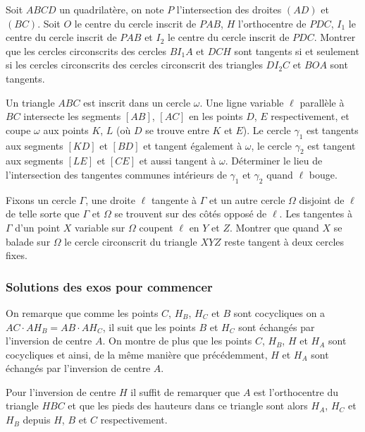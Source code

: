 \begin{exo}
Soit $ABCD$ un quadrilatère, on note $P$ l'intersection des droites $(AD)$ et $(BC)$. Soit $O$ le centre du cercle inscrit de $PAB$, $H$ l'orthocentre de $PDC$, $I_1$ le centre du cercle inscrit de $PAB$ et $I_2$ le centre du cercle inscrit de $PDC$. Montrer que les cercles circonscrits des cercles $BI_1A$ et $DCH$ sont tangents si et seulement si les cercles circonscrits des cercles circonscrit des triangles $DI_2C$ et $BOA$ sont tangents.
\end{exo}

\begin{exo}[RMM 2011 P3]
Un triangle $ABC$ est inscrit dans un cercle $\omega$.
Une ligne variable $\ell$ parallèle à $BC$ intersecte les segments $[AB]$, $[AC]$ en les points $D$, $E$ respectivement, et coupe $\omega$ aux points $K$, $L$ (où $D$ se trouve entre $K$ et $E$).
Le cercle $\gamma_1$ est tangents aux segments $[KD]$ et $[BD]$ et tangent également à $\omega$, le cercle $\gamma_2$ est tangent aux segments $[LE]$ et $[CE]$ et aussi tangent à $\omega$.
Déterminer le lieu de l'intersection des tangentes communes intérieurs de $\gamma_1$ et $\gamma_2$ quand $\ell$ bouge.
\end{exo}

\begin{exo}[RMM 2018 P6]
Fixons un cercle $\Gamma$, une droite $\ell$ tangente à $\Gamma$ et un autre cercle $\Omega$ disjoint de $\ell$ de telle sorte que $\Gamma$ et $\Omega$ se trouvent sur des côtés opposé de $\ell$. Les tangentes à $\Gamma$ d'un point $X$ variable sur $\Omega$ coupent $\ell$ en $Y$ et $Z$. Montrer que quand $X$ se balade sur $\Omega$ le cercle circonscrit du triangle $XYZ$ reste tangent à deux cercles fixes.
\end{exo}

\newpage



\subsubsection{Solutions des exos pour commencer}

\begin{sol}
On remarque que comme les points $C$, $H_B$, $H_C$ et $B$ sont cocycliques on a $AC\cdot AH_B=AB\cdot AH_C$, il suit que les points $B$ et $H_C$ sont échangés par l'inversion de centre $A$. On montre de plus que les points $C$, $H_B$, $H$ et $H_A$ sont cocycliques et ainsi, de la même manière que précédemment, $H$ et $H_A$ sont échangés par l'inversion de centre $A$.

Pour l'inversion de centre $H$ il suffit de remarquer que $A$ est l'orthocentre du triangle $HBC$ et que les pieds des hauteurs dans ce triangle sont alors $H_A$, $H_C$ et $H_B$ depuis $H$, $B$ et $C$ respectivement.
\end{sol}

